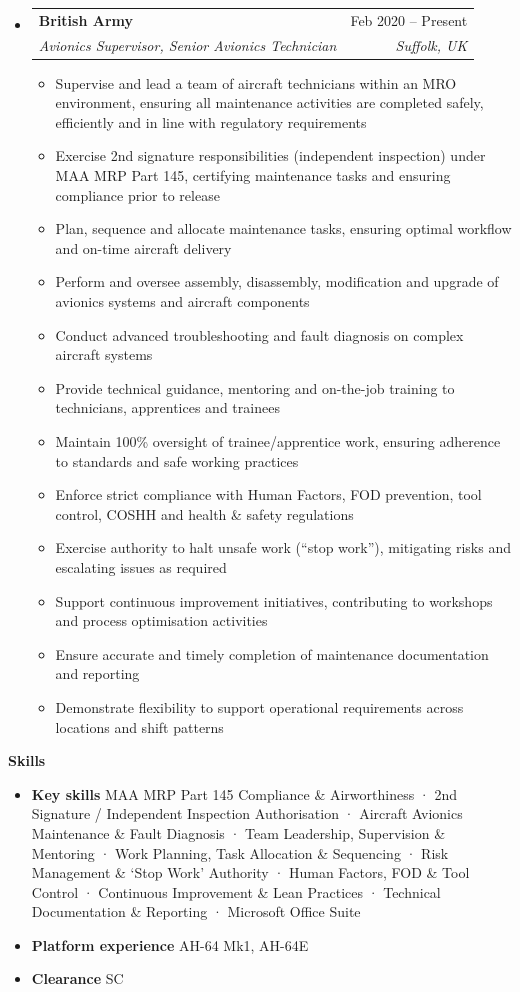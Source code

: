 \documentclass[a4paper,12pt]{article}[leftmargin=*]
\makeatletter
\def \entryspacing {-0pt}
\renewcommand{\section}[2]{\vspace{5pt}
  \colorbox{secondary}{\color{white}\raggedbottom\normalsize\textbf{{#1}{\hspace{7pt}#2}}}
}
\newcommand{\resumeEntryStart}{\begin{itemize}[leftmargin=2.5mm]}
\newcommand{\resumeEntryEnd}{\end{itemize}\vspace{\entryspacing}}
\newcommand{\resumeItemListStart}{\begin{itemize}[leftmargin=4.5mm]}
\newcommand{\resumeItemListEnd}{\end{itemize}}
\newcommand{\resumeItem}[1]{
  \item\small{
    {#1 \vspace{-2pt}}
  }
}
\newcommand{\resumeEntryTSDL}[4]{
  \vspace{-1pt}\item[]
    \begin{tabularx}{0.97\textwidth}{X@{\hspace{60pt}}r}
      \textbf{\color{primary}#1} & {\firabook\color{accent}\small#2} \\
      \textit{\color{accent}\small#3} & \textit{\color{accent}\small#4} \\
    \end{tabularx}\vspace{-6pt}
}
\newcommand{\resumeEntryS}[2]{
  \item[]\small{
    \textbf{\color{primary}#1 }{ #2 \vspace{-6pt}}
  }
}
\makeatother
\begin{document}
  \resumeEntryStart
    \resumeEntryTSDL
      {British Army}{Feb 2020 -- Present}
      {Avionics Supervisor, Senior Avionics Technician}{Suffolk, UK}
    \resumeItemListStart
      \resumeItem {Supervise and lead a team of aircraft technicians within an MRO environment, ensuring all maintenance activities are completed safely, efficiently and in line with regulatory requirements}
      \resumeItem {Exercise 2nd signature responsibilities (independent inspection) under MAA MRP Part 145, certifying maintenance tasks and ensuring compliance prior to release}
      \resumeItem {Plan, sequence and allocate maintenance tasks, ensuring optimal workflow and on-time aircraft delivery}
      \resumeItem {Perform and oversee assembly, disassembly, modification and upgrade of avionics systems and aircraft components}
      \resumeItem {Conduct advanced troubleshooting and fault diagnosis on complex aircraft systems}
      \resumeItem {Provide technical guidance, mentoring and on-the-job training to technicians, apprentices and trainees}
      \resumeItem {Maintain 100\% oversight of trainee/apprentice work, ensuring adherence to standards and safe working practices}
      \resumeItem {Enforce strict compliance with Human Factors, FOD prevention, tool control, COSHH and health \& safety regulations}
      \resumeItem {Exercise authority to halt unsafe work (“stop work”), mitigating risks and escalating issues as required}
      \resumeItem {Support continuous improvement initiatives, contributing to workshops and process optimisation activities}
      \resumeItem {Ensure accurate and timely completion of maintenance documentation and reporting}
      \resumeItem {Demonstrate flexibility to support operational requirements across locations and shift
patterns}
    \resumeItemListEnd
  \resumeEntryEnd

\section{\faGears}{Skills}
 \resumeEntryStart
  \resumeEntryS{Key skills} {MAA MRP Part 145 Compliance \& Airworthiness · 2nd Signature / Independent Inspection Authorisation · Aircraft Avionics Maintenance \& Fault Diagnosis · Team Leadership, Supervision \& Mentoring · Work Planning, Task Allocation \& Sequencing · Risk Management \& ‘Stop Work’ Authority · Human Factors, FOD \& Tool Control · Continuous Improvement \& Lean Practices · Technical Documentation \& Reporting · Microsoft Office Suite}
  \resumeEntryS{Platform experience} {AH-64 Mk1, AH-64E}
  \resumeEntryS{Clearance} {SC}
 \resumeEntryEnd
\end{document}

